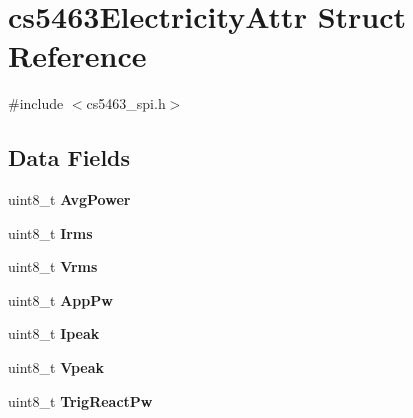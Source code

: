 \hypertarget{structcs5463ElectricityAttr}{\section{cs5463\-Electricity\-Attr Struct Reference}
\label{structcs5463ElectricityAttr}
}


{\ttfamily \#include $<$cs5463\-\_\-spi.\-h$>$}

\subsection*{Data Fields}
\begin{DoxyCompactItemize}
\item 
\hypertarget{structcs5463ElectricityAttr_adab383120f402c60f04ccfd55e87dda2}{uint8\-\_\-t {\bfseries Avg\-Power}}\label{structcs5463ElectricityAttr_adab383120f402c60f04ccfd55e87dda2}

\item 
\hypertarget{structcs5463ElectricityAttr_a615e42e7b1a421ab7089dc76c8dc2a5a}{uint8\-\_\-t {\bfseries Irms}}\label{structcs5463ElectricityAttr_a615e42e7b1a421ab7089dc76c8dc2a5a}

\item 
\hypertarget{structcs5463ElectricityAttr_a086aae2efabb2e202690b0e6990242ab}{uint8\-\_\-t {\bfseries Vrms}}\label{structcs5463ElectricityAttr_a086aae2efabb2e202690b0e6990242ab}

\item 
\hypertarget{structcs5463ElectricityAttr_aef14e8094f9e14868e559f707949e3ad}{uint8\-\_\-t {\bfseries App\-Pw}}\label{structcs5463ElectricityAttr_aef14e8094f9e14868e559f707949e3ad}

\item 
\hypertarget{structcs5463ElectricityAttr_af1d97b55d7e4f5b7c5616a53157fd920}{uint8\-\_\-t {\bfseries Ipeak}}\label{structcs5463ElectricityAttr_af1d97b55d7e4f5b7c5616a53157fd920}

\item 
\hypertarget{structcs5463ElectricityAttr_a87b8fed2d10a63aa8903aa20a528a719}{uint8\-\_\-t {\bfseries Vpeak}}\label{structcs5463ElectricityAttr_a87b8fed2d10a63aa8903aa20a528a719}

\item 
\hypertarget{structcs5463ElectricityAttr_a685348ca9ef2ab6d73f951179fb20402}{uint8\-\_\-t {\bfseries Trig\-React\-Pw}}\label{structcs5463ElectricityAttr_a685348ca9ef2ab6d73f951179fb20402}


\end{DoxyCompactItemize}
